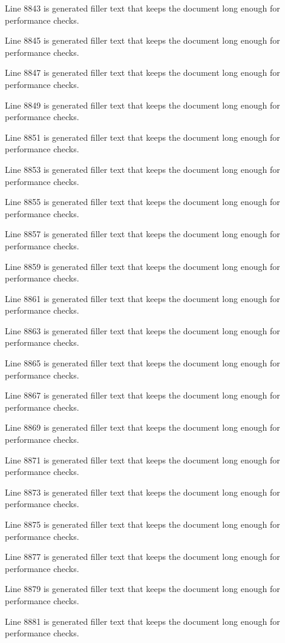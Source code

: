 Line 8843 is generated filler text that keeps the document long enough for performance checks.

Line 8845 is generated filler text that keeps the document long enough for performance checks.

Line 8847 is generated filler text that keeps the document long enough for performance checks.

Line 8849 is generated filler text that keeps the document long enough for performance checks.

Line 8851 is generated filler text that keeps the document long enough for performance checks.

Line 8853 is generated filler text that keeps the document long enough for performance checks.

Line 8855 is generated filler text that keeps the document long enough for performance checks.

Line 8857 is generated filler text that keeps the document long enough for performance checks.

Line 8859 is generated filler text that keeps the document long enough for performance checks.

Line 8861 is generated filler text that keeps the document long enough for performance checks.

Line 8863 is generated filler text that keeps the document long enough for performance checks.

Line 8865 is generated filler text that keeps the document long enough for performance checks.

Line 8867 is generated filler text that keeps the document long enough for performance checks.

Line 8869 is generated filler text that keeps the document long enough for performance checks.

Line 8871 is generated filler text that keeps the document long enough for performance checks.

Line 8873 is generated filler text that keeps the document long enough for performance checks.

Line 8875 is generated filler text that keeps the document long enough for performance checks.

Line 8877 is generated filler text that keeps the document long enough for performance checks.

Line 8879 is generated filler text that keeps the document long enough for performance checks.

Line 8881 is generated filler text that keeps the document long enough for performance checks.


